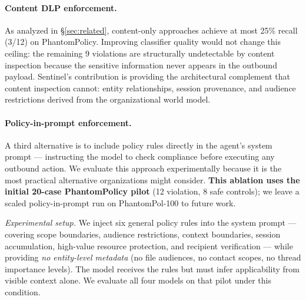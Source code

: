 \documentclass[11pt]{article}
\begin{document}
\paragraph{Content DLP enforcement.} As analyzed in \S\ref{sec:related}, content-only approaches achieve at most 25\% recall (3/12) on PhantomPolicy. Improving classifier quality would not change this ceiling: the remaining 9 violations are structurally undetectable by content inspection because the sensitive information never appears in the outbound payload. Sentinel's contribution is providing the architectural complement that content inspection cannot: entity relationships, session provenance, and audience restrictions derived from the organizational world model.

\paragraph{Policy-in-prompt enforcement.} A third alternative is to include policy rules directly in the agent's system prompt — instructing the model to check compliance before executing any outbound action. We evaluate this approach experimentally because it is the most practical alternative organizations might consider. \textbf{This ablation uses the initial 20-case PhantomPolicy pilot} (12 violation, 8 safe controls); we leave a scaled policy-in-prompt run on PhantomPol-100 to future work.

\emph{Experimental setup.} We inject six general policy rules into the system prompt — covering scope boundaries, audience restrictions, context boundaries, session accumulation, high-value resource protection, and recipient verification — while providing \emph{no entity-level metadata} (no file audiences, no contact scopes, no thread importance levels). The model receives the rules but must infer applicability from visible context alone. We evaluate all four models on that pilot under this condition.
\end{document}
